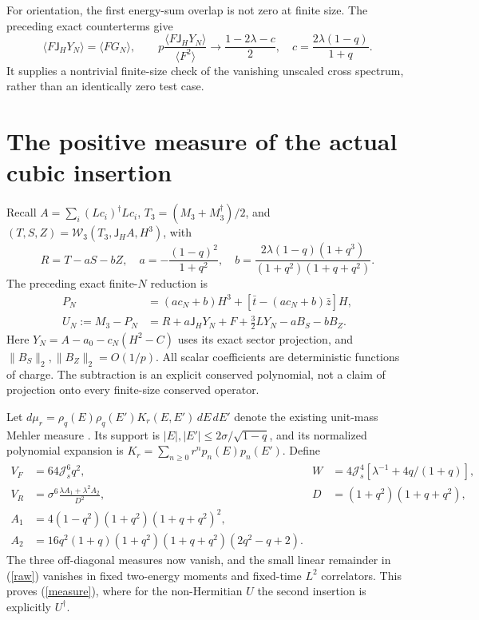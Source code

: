 \documentclass[11pt,a4paper]{article}
\newcommand{\Js}{\mathcal J_s}
\newcommand{\av}[1]{\langle #1\rangle}
\newcommand{\W}{\mathcal W}
\newcommand{\JH}{\mathsf J_H}
\begin{document}
For orientation, the first energy-sum overlap is not zero at finite
size. The preceding exact counterterms give
\begin{equation}
 \av{F\JH Y_N}=\av{FG_N},\qquad
 p\frac{\av{F\JH Y_N}}{\av{F^2}}
 \longrightarrow\frac{1-2\lambda-c}{2},\quad
 c=\frac{2\lambda(1-q)}{1+q}.\label{leak}
\end{equation}
It supplies a nontrivial finite-size check of the vanishing unscaled
cross spectrum, rather than an identically zero test case.

\newpage
\section{The positive measure of the actual cubic insertion}
Recall $A=\sum_i(Lc_i)^\dagger Lc_i$, $T_3=(M_3+M_3^\dagger)/2$,
and $(T,S,Z)=\W_3(T_3,\JH A,H^3)$, with
\[
 R=T-aS-bZ,\quad a=-\frac{(1-q)^2}{1+q^2},\quad
 b=\frac{2\lambda(1-q)(1+q^3)}{(1+q^2)(1+q+q^2)}.
\]
The preceding exact finite-$N$ reduction is
\begin{align}
 P_N&=(ac_N+b)H^3+[\bar t-(ac_N+b)\bar z]H,\\
 U_N:=M_3-P_N&=R+a\JH Y_N+F+\tfrac32LY_N-aB_S-bB_Z.\label{raw}
\end{align}
Here $Y_N=A-a_0-c_N(H^2-C)$ uses its exact sector projection,
and $\|B_S\|_2,\|B_Z\|_2=O(1/p)$. All scalar coefficients are
deterministic functions of charge. The subtraction is an explicit
conserved polynomial, not a claim of projection onto every
finite-size conserved operator.

Let $d\mu_r=\rho_q(E)\rho_q(E')K_r(E,E')\,dE\,dE'$ denote the
existing unit-mass Mehler measure \cite{tall,bnr}. Its support is
$|E|,|E'|\leq2\sigma/\sqrt{1-q}$, and its normalized polynomial
expansion is $K_r=\sum_{n\geq0}r^n p_n(E)p_n(E')$.
Define
\begin{align}
 V_F&=64\Js^6q^2,&W&=4\Js^4[\lambda^{-1}+4q/(1+q)],\\
 V_R&=\sigma^6\frac{\lambda A_1+\lambda^2 A_2}{D^2},&
 D&=(1+q^2)(1+q+q^2),\\
 A_1&=4(1-q^2)(1+q^2)(1+q+q^2)^2,\\
 A_2&=16q^2(1+q)(1+q^2)(1+q+q^2)(2q^2-q+2).
\end{align}
The three off-diagonal measures now vanish, and the small linear
remainder in (\ref{raw}) vanishes in fixed two-energy moments and
fixed-time $L^2$ correlators. This proves (\ref{measure}), where for
the non-Hermitian $U$ the second insertion is explicitly $U^\dagger$.
\end{document}
